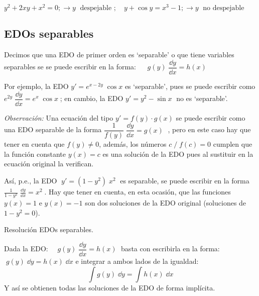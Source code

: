 $y^2+2xy+x^2=0;\to y\;  \text { despejable }; \quad
y+\cos y=x^3-1; \to y\;  \text { no despejable }$


\subsection{EDOs separables}

\begin{cuadro-naranja}	
\begin{defi}
Decimos que una EDO de primer orden es `separable' o que tiene variables separables se se puede escribir en la forma: $\displaystyle \quad  \boxed{\;  g(y)\; \dfrac {\dd y}{\dd x}=h(x)\;} $
\end{defi}
\end{cuadro-naranja}

Por ejemplo, la EDO $y'=e^{x-2y}\; \cos x$ es `separable', pues se puede escribir como $e^{2y}\; \dfrac {\dd y}{\dd x}=e^x\; \cos x\; $;  en cambio, la EDO $y'=y^2-\sin x\; $ no es `separable'.

\vspace{2mm}

\emph{Observación:} Una ecuación del tipo $y'=f(y)\cdot g(x)$ se puede escribir como una EDO separable de la forma $\dfrac 1 {f(y)}\; \dfrac {\dd y}{\dd x} = g(x)\;$ , pero en este caso hay que tener en cuenta que $f(y)\neq 0$, además, los números $c\; / \; f(c)=0$ cumplen que la función constante $y(x)=c$ es una solución de la EDO pues al sustituir en la ecuación original la verifican.

Así, p.e., la EDO $\; y'=(1-y^2)\; x^2\; $ es separable, se puede escribir en la forma $\frac 1 {1-y^2}\; \frac {\dd y}{\dd x}= x^2\;$. Hay que tener en cuenta, en esta ocasión, que las funciones $y(x)=1$ e $y(x)=-1$ son dos soluciones de la EDO original (soluciones de $1-y^2=0$).

\begin{cuadro-naranja}
\begin{teor}{Resolución EDOs separables.}

	Dada la EDO: $\displaystyle \quad  g(y)\; \dfrac {\dd y}{\dd x}=h(x)\; $ basta con escribirla en la forma: $\; g(y)\; \dd y = h(x)\; \dd x$ e integrar a ambos lados de la igualdad:
	\begin{equation*}
		\boxed{\; \int g(y)\; \dd y = \int h(x)\; \dd x\; }
	\end{equation*}
	Y así se obtienen todas las soluciones de la EDO de forma implícita.
\end{teor}
\end{cuadro-naranja}

